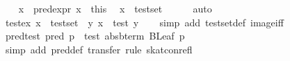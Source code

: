 \begin{isabellebody}
\ \ \isamarkupfalse%
\ {}x\ {}\ pred{}expr\ x{}{}\ \ this\ \isamarkupfalse%
\ {}{}x\ {}\ test{}set{}\isanewline
\ \ \ \ \isamarkupfalse%
\ auto\isanewline
{}\isamarkupfalse%
%
\endisatagproof
{\isafoldproof}%
%
\isadelimproof
\isanewline
%
\endisadelimproof
\isanewline
{}\isamarkupfalse%
\ test{}ex{}\ {}x\ {}\ test{}set\ {}\ {}y{}\ x\ {}\ test\ y{}\isanewline
%
\isadelimproof
\ \ %
\endisadelimproof
%
\isatagproof
{}\isamarkupfalse%
\ {}simp\ add{}\ test{}set{}def\ image{}iff{}%
\endisatagproof
{\isafoldproof}%
%
\isadelimproof
\isanewline
%
\endisadelimproof
\isanewline
{}\isamarkupfalse%
\ pred{}test{}\ {}pred\ p\ {}\ test\ {}abs{}bterm\ {}BLeaf\ p{}{}{}\isanewline
%
\isadelimproof
\ \ %
\endisadelimproof
%
\isatagproof
{}\isamarkupfalse%
\ {}simp\ add{}\ pred{}def{}\ transfer{}\ rule\ skat{}con{}refl{}%
\endisatagproof
{\isafoldproof}%
%
\isadelimproof
\isanewline
%
\endisadelimproof
\isanewline
{}\isamarkupfalse%

\end{isabellebody}
